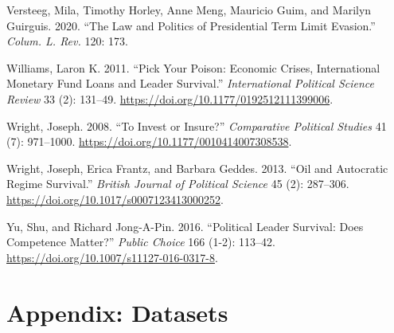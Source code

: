 \documentclass[
  12pt,
]{report}
\newlength{\cslhangindent}
\newenvironment{CSLReferences}[2] %
 {\begin{list}{}{%
  \setlength{\itemindent}{0pt}
  \setlength{\leftmargin}{0pt}
  \setlength{\parsep}{0pt}
  \ifodd #1
   \setlength{\leftmargin}{\cslhangindent}
   \setlength{\itemindent}{-1\cslhangindent}
  \fi
  \setlength{\itemsep}{#2\baselineskip}}}
 {\end{list}}
\begin{document}
\begin{CSLReferences}{1}{0}
Versteeg, Mila, Timothy Horley, Anne Meng, Mauricio Guim, and Marilyn
Guirguis. 2020. {``The Law and Politics of Presidential Term Limit
Evasion.''} \emph{Colum. L. Rev.} 120: 173.

Williams, Laron K. 2011. {``Pick Your Poison: Economic Crises,
International Monetary Fund Loans and Leader Survival.''}
\emph{International Political Science Review} 33 (2): 131--49.
\url{https://doi.org/10.1177/0192512111399006}.

Wright, Joseph. 2008. {``To Invest or Insure?''} \emph{Comparative
Political Studies} 41 (7): 971--1000.
\url{https://doi.org/10.1177/0010414007308538}.

Wright, Joseph, Erica Frantz, and Barbara Geddes. 2013. {``Oil and
Autocratic Regime Survival.''} \emph{British Journal of Political
Science} 45 (2): 287--306.
\url{https://doi.org/10.1017/s0007123413000252}.

Yu, Shu, and Richard Jong-A-Pin. 2016. {``Political Leader Survival:
Does Competence Matter?''} \emph{Public Choice} 166 (1-2): 113--42.
\url{https://doi.org/10.1007/s11127-016-0317-8}.

\end{CSLReferences}

\chapter*{\texorpdfstring{Appendix\textbf{:
Datasets}}{Appendix: Datasets}}\label{appendix-datasets}
\end{document}
